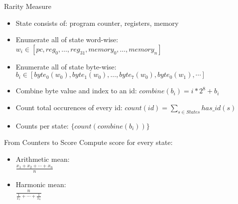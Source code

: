 \documentclass[10pt]{beamer}
\begin{document}
\begin{frame}{Rarity Measure}
	\begin{itemize}
    \item State consists of: program counter, registers, memory
    \item Enumerate all of state word-wise: $w_i \in [pc, reg_0, \ldots, reg_{31}, memory_0, \ldots, memory_n]$
    \item Enumerate all of state byte-wise: $b_i \in [ byte_0(w_0), byte_1(w_0), \ldots, byte_7(w_0), byte_0(w_1), \cdots ]$
    \item Combine byte value and index to an id: $combine(b_i) = i * 2^8 + b_i$
    \item Count total occurences of every id: $count(id) = \sum_{s \in States} has\_id(s)$
    \item Counts per state: $\{ count(combine(b_i)) \}$
	\end{itemize}
\end{frame}

\begin{frame}{From Counters to Score}
  Compute score for every state:

  \begin{itemize}
    \item Arithmetic mean: \\
      $\frac{x_1 + x_2 + \cdots + x_n}{n}$
    \item Harmonic mean: \\
      $\frac{n}{\frac{1}{x_1} + \dotsb + \frac{1}{x_n}}$
  \end{itemize}
\end{frame}

\begin{frame}[allowframebreaks]
    \printbibliography
\end{frame}
\end{document}
